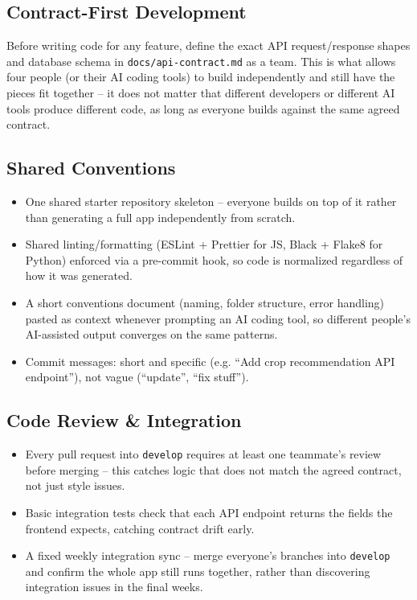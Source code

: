 \documentclass[11pt,a4paper]{article}
\begin{document}
\subsection{Contract-First Development}
Before writing code for any feature, define the exact API request/response
shapes and database schema in \texttt{docs/api-contract.md} as a team.
This is what allows four people (or their AI coding tools) to build
independently and still have the pieces fit together -- it does not
matter that different developers or different AI tools produce different
code, as long as everyone builds against the same agreed contract.

\subsection{Shared Conventions}
\begin{itemize}[leftmargin=*]
  \item One shared starter repository skeleton -- everyone builds on top
    of it rather than generating a full app independently from scratch.
  \item Shared linting/formatting (ESLint + Prettier for JS, Black +
    Flake8 for Python) enforced via a pre-commit hook, so code is
    normalized regardless of how it was generated.
  \item A short conventions document (naming, folder structure, error
    handling) pasted as context whenever prompting an AI coding tool, so
    different people's AI-assisted output converges on the same
    patterns.
  \item Commit messages: short and specific (e.g. ``Add crop
    recommendation API endpoint''), not vague (``update'', ``fix
    stuff'').
\end{itemize}

\subsection{Code Review \& Integration}
\begin{itemize}[leftmargin=*]
  \item Every pull request into \texttt{develop} requires at least one
    teammate's review before merging -- this catches logic that does not
    match the agreed contract, not just style issues.
  \item Basic integration tests check that each API endpoint returns the
    fields the frontend expects, catching contract drift early.
  \item A fixed weekly integration sync -- merge everyone's branches into
    \texttt{develop} and confirm the whole app still runs together,
    rather than discovering integration issues in the final weeks.
\end{itemize}
\end{document}
